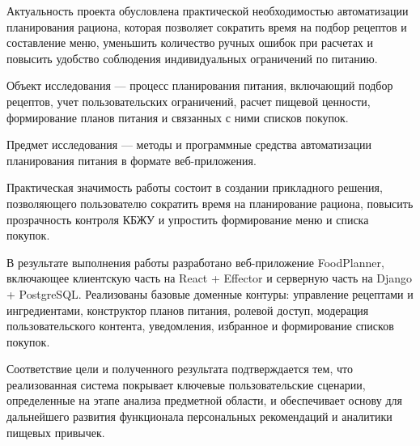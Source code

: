 Актуальность проекта обусловлена практической необходимостью автоматизации планирования рациона, которая позволяет сократить время на подбор рецептов и составление меню, уменьшить количество ручных ошибок при расчетах и повысить удобство соблюдения индивидуальных ограничений по питанию.

Объект исследования --- процесс планирования питания, включающий подбор рецептов, учет пользовательских ограничений, расчет пищевой ценности, формирование планов питания и связанных с ними списков покупок.

Предмет исследования --- методы и программные средства автоматизации планирования питания в формате веб-приложения.

Практическая значимость работы состоит в создании прикладного решения, позволяющего пользователю сократить время на планирование рациона, повысить прозрачность контроля КБЖУ и упростить формирование меню и списка покупок.

В результате выполнения работы разработано веб-приложение FoodPlanner, включающее клиентскую часть на React + Effector и серверную часть на Django + PostgreSQL. Реализованы базовые доменные контуры: управление рецептами и ингредиентами, конструктор планов питания, ролевой доступ, модерация пользовательского контента, уведомления, избранное и формирование списков покупок.

Соответствие цели и полученного результата подтверждается тем, что реализованная система покрывает ключевые пользовательские сценарии, определенные на этапе анализа предметной области, и обеспечивает основу для дальнейшего развития функционала персональных рекомендаций и аналитики пищевых привычек.


